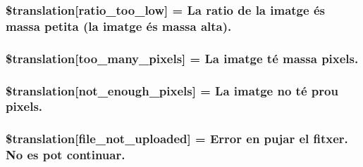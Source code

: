 \subsubsection[{\$translation}]{\setlength{\rightskip}{0pt plus 5cm}\$translation\mbox{[}\textquotesingle{}ratio\+\_\+too\+\_\+low\textquotesingle{}\mbox{]} = \textquotesingle{}La ratio de la imatge és massa petita (la imatge és massa alta).\textquotesingle{}}\label{class_8upload_8ca___c_a_8php_ac533b9a479f056b0b8623e4268f068c2}
\hypertarget{class_8upload_8ca___c_a_8php_aa4051ef64e94a3f8295c63cf85544016}{}
\subsubsection[{\$translation}]{\setlength{\rightskip}{0pt plus 5cm}\$translation\mbox{[}\textquotesingle{}too\+\_\+many\+\_\+pixels\textquotesingle{}\mbox{]} = \textquotesingle{}La imatge té massa pixels.\textquotesingle{}}\label{class_8upload_8ca___c_a_8php_aa4051ef64e94a3f8295c63cf85544016}
\hypertarget{class_8upload_8ca___c_a_8php_a1fe342c27ce61f4ff4e0120ba647033e}{}
\subsubsection[{\$translation}]{\setlength{\rightskip}{0pt plus 5cm}\$translation\mbox{[}\textquotesingle{}not\+\_\+enough\+\_\+pixels\textquotesingle{}\mbox{]} = \textquotesingle{}La imatge no té prou pixels.\textquotesingle{}}\label{class_8upload_8ca___c_a_8php_a1fe342c27ce61f4ff4e0120ba647033e}
\hypertarget{class_8upload_8ca___c_a_8php_a4ce76e7be0b3a03c2b47f6d70c21832e}{}
\subsubsection[{\$translation}]{\setlength{\rightskip}{0pt plus 5cm}\$translation\mbox{[}\textquotesingle{}file\+\_\+not\+\_\+uploaded\textquotesingle{}\mbox{]} = \textquotesingle{}Error en pujar el fitxer. No es pot continuar.\textquotesingle{}}\label{class_8upload_8ca___c_a_8php_a4ce76e7be0b3a03c2b47f6d70c21832e}
\hypertarget{class_8upload_8ca___c_a_8php_afd84e910217f04139f567c41e292afa5}{}

